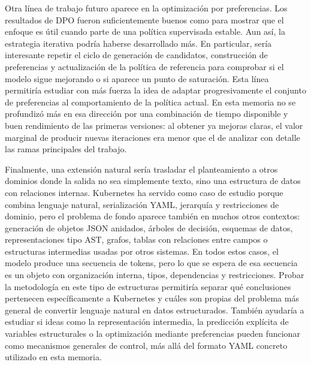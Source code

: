 Otra línea de trabajo futuro aparece en la optimización por preferencias. Los resultados de DPO fueron suficientemente buenos como
para mostrar que el enfoque es útil cuando parte de una política supervisada estable. Aun así, la estrategia iterativa podría haberse
desarrollado más. En particular, sería interesante repetir el ciclo de generación de candidatos, construcción de preferencias y
actualización de la política de referencia para comprobar si el modelo sigue mejorando o si aparece un punto de saturación. Esta
línea permitiría estudiar con más fuerza la idea de adaptar progresivamente el conjunto de preferencias al comportamiento de la
política actual. En esta memoria no se profundizó más en esa dirección por una combinación de tiempo disponible y buen rendimiento
de las primeras versiones: al obtener ya mejoras claras, el valor marginal de producir nuevas iteraciones era menor que el de
analizar con detalle las ramas principales del trabajo.

Finalmente, una extensión natural sería trasladar el planteamiento a otros dominios donde la salida no sea simplemente texto,
sino una estructura de datos con relaciones internas. Kubernetes ha servido como caso de estudio porque combina lenguaje natural,
serialización YAML, jerarquía y restricciones de dominio, pero el problema de fondo aparece también en muchos otros contextos:
generación de objetos JSON anidados, árboles de decisión, esquemas de datos, representaciones tipo AST, grafos, tablas con relaciones
entre campos o estructuras intermedias usadas por otros sistemas. En todos estos casos, el modelo produce una secuencia de tokens,
pero lo que se espera de esa secuencia es un objeto con organización interna, tipos, dependencias y restricciones. Probar la
metodología en este tipo de estructuras permitiría separar qué conclusiones pertenecen específicamente a Kubernetes y cuáles son
propias del problema más general de convertir lenguaje natural en datos estructurados. También ayudaría a estudiar si ideas como la
representación intermedia, la predicción explícita de variables estructurales o la optimización mediante preferencias pueden
funcionar como mecanismos generales de control, más allá del formato YAML concreto utilizado en esta memoria.
